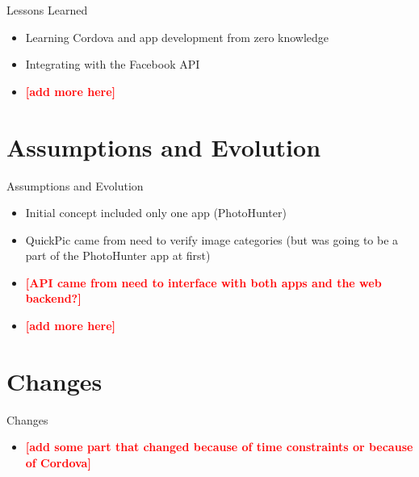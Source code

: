 \documentclass[aspectratio=169]{beamer}
\newcommand{\todo}[1]{\textcolor{red}{\textbf{[#1]}}}
\begin{document}
\begin{frame}{Lessons Learned}
	\begin{itemize}

		\item Learning Cordova and app development from zero knowledge

		\item Integrating with the Facebook API

		\item \todo{add more here}

	\end{itemize}
\end{frame}

\section{Assumptions and Evolution}

\begin{frame}{Assumptions and Evolution}
	\begin{itemize}

		\item Initial concept included only one app (PhotoHunter)

		\item QuickPic came from need to verify image categories (but was going to
					be a part of the PhotoHunter app at first)

		\item \todo{API came from need to interface with both apps and the web backend?}

		\item \todo{add more here}

	\end{itemize}
\end{frame}

\section{Changes}

\begin{frame}{Changes}
	\begin{itemize}

		\item \todo{add some part that changed because of time constraints or because of Cordova}

	\end{itemize}
\end{frame}
\end{document}
